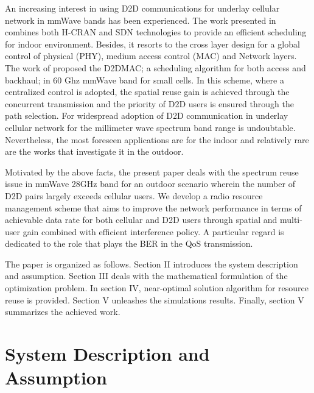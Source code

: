 \documentclass[conference,onecolumn,12pt]{IEEEtran}
\begin{document}
An increasing interest in using D2D communications for underlay cellular network in mmWave bands has been experienced. The work presented in \cite{mmWvCroosLayer} combines both H-CRAN and SDN technologies to provide an efficient scheduling for indoor environment. Besides, it resorts to the cross layer design for a global control of physical (PHY), medium access control (MAC) and Network layers. The work of \cite{mmWavSmallCell} proposed the D2DMAC; a scheduling algorithm for both access and backhaul; in 60 Ghz mmWave band for small cells. In this scheme, where a centralized control is adopted, the spatial reuse gain is achieved through the concurrent transmission and the priority of D2D users is ensured through the path selection. For widespread adoption of D2D communication in underlay cellular network for the millimeter wave spectrum band range is undoubtable. Nevertheless, the most foreseen applications are for the indoor and relatively rare are the works that investigate it in the outdoor.

Motivated by the above facts, the present paper deals with the spectrum reuse issue in mmWave 28GHz band for an outdoor scenario wherein the number of D2D pairs largely exceeds cellular users. We develop a radio resource management scheme that aims to improve the network performance in terms of achievable data rate for both cellular and D2D users through spatial and multi-user gain combined with efficient interference policy. A particular regard is dedicated to the role that plays the BER in the QoS transmission.

The paper is organized as follows. Section II introduces the system description and assumption. Section III deals with the mathematical formulation of the optimization problem. In section IV, near-optimal solution algorithm for resource reuse is provided. Section V unleashes the simulations results. Finally, section V summarizes the achieved work.

\section{System Description and Assumption}
\end{document}
